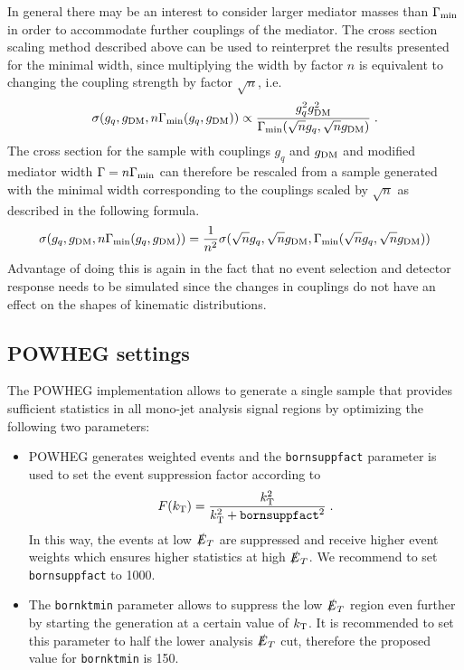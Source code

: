 In general there may be an interest to consider larger mediator masses than $\Gamma_{\rm{min}}$ in order to accommodate further couplings of the mediator. The cross section scaling method described above can be used to reinterpret the results presented for the minimal width, since multiplying the width by factor $n$ is equivalent to changing the coupling strength by factor $\sqrt{n}$, i.e.
\begin{equation}
\sigma(g_q,g_{\rm{DM}}, n\Gamma_{\rm{min}}(g_q,g_{\rm{DM}})) \propto \frac{g_q^2 g_{\rm{DM}}^2}{\Gamma_{\rm{min}}(\sqrt{n}g_q,\sqrt{n}g_{\rm{DM}})} \;.
\end{equation}
The cross section for the sample with couplings $g_q$ and $g_{\rm{DM}}$ and modified mediator width $\Gamma = n\Gamma_{\rm{min}}$ can therefore be rescaled from a sample generated with the minimal width corresponding to the couplings scaled by $\sqrt{n}$ as described in the following formula.
\begin{equation}
\sigma(g_q,g_{\rm{DM}}, n\Gamma_{\rm{min}}(g_q,g_{\rm{DM}})) = \frac{1}{n^2} \sigma(\sqrt{n}g_q,\sqrt{n}g_{\rm{DM}},\Gamma_{\rm{min}}(\sqrt{n}g_q,\sqrt{n}g_{\rm{DM}}))
\end{equation}
Advantage of doing this is again in the fact that no event selection and detector response needs to be simulated since the changes in couplings do not have an effect on the shapes of kinematic distributions.




\subsection{POWHEG settings}

The POWHEG implementation allows to generate a single sample that provides sufficient statistics in all mono-jet analysis signal regions by optimizing the following two parameters:
\begin{itemize}
\item POWHEG generates weighted events and the \verb+bornsuppfact+ parameter is used to set the event suppression factor according to
\begin{equation}
F(k_{\rm{T}})=\frac{k_{\rm{T}}^2}{k_{\rm{T}}^2+\texttt{bornsuppfact}^2} \;.
\end{equation}
In this way, the events at low $\slashed{E}_T$ are suppressed and receive higher event weights which ensures higher statistics at high $\slashed{E}_T$. We recommend to set \verb+bornsuppfact+ to 1000.
\item The \verb+bornktmin+ parameter allows to suppress the low $\slashed{E}_T$ region even further by starting the generation at a certain value of $k_{\rm{T}}$. It is recommended to set this parameter  to half the lower analysis $\slashed{E}_T$ cut, therefore the proposed value for \verb+bornktmin+ is 150.
\end{itemize}


